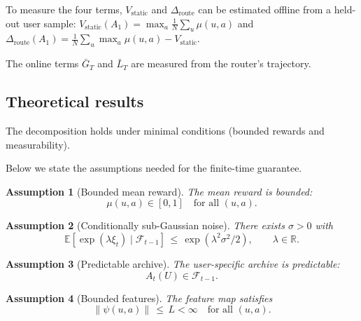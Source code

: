 \documentclass{article} %
\newtheorem{assumption}{Assumption}
\providecommand{\E}{\mathbb{E}}
\begin{document}
To measure the four terms, $V_{\mathrm{static}}$ and $\Delta_{\mathrm{route}}$ can be estimated offline from a held-out user sample: $V_{\mathrm{static}}(A_1) = \max_{a} \frac{1}{N}\sum_u \mu(u,a)$ and $\Delta_{\mathrm{route}}(A_1) = \frac{1}{N}\sum_u \max_a \mu(u,a) - V_{\mathrm{static}}$.

The online terms $\bar G_T$ and $\bar L_T$ are measured from the router's trajectory.

\subsection{Theoretical results}

\label{sec:method-assump}

The decomposition holds under minimal conditions (bounded rewards and measurability).

Below we state the assumptions needed for the finite-time guarantee.

\begin{assumption}[Bounded mean reward]
\label{ass:bounded}
The mean reward is bounded:
\begin{equation}
\label{eq:ass-bounded}
\mu(u,a) \in [0,1] \quad \text{for all } (u,a).
\end{equation}
\end{assumption}

\begin{assumption}[Conditionally sub-Gaussian noise]
\label{ass:subg}
There exists $\sigma > 0$ with
\begin{equation}
\label{eq:ass-subg}
\E\!\left[\exp(\lambda \xi_t) \mid \mathcal{F}_{t-1}\right] \,\le\, \exp(\lambda^2 \sigma^2 / 2), \qquad \lambda \in \mathbb{R}.
\end{equation}
\end{assumption}

\begin{assumption}[Predictable archive]
\label{ass:predictable}
The user-specific archive is predictable:
\begin{equation}
\label{eq:ass-pred}
A_t(U) \in \mathcal{F}_{t-1}.
\end{equation}
\end{assumption}

\begin{assumption}[Bounded features]
\label{ass:bounded-feat}
The feature map satisfies
\begin{equation}
\label{eq:ass-feat}
\|\psi(u,a)\| \,\le\, L < \infty \quad \text{for all } (u,a).
\end{equation}
\end{assumption}
\end{document}
